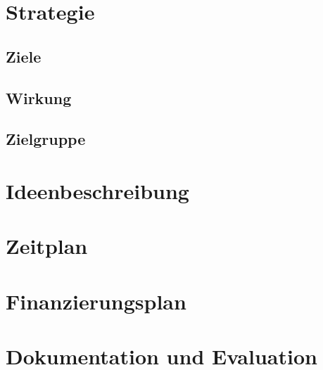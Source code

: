 \chapter{Strategie}

\section{Ziele}

\section{Wirkung}

\section{Zielgruppe}

\chapter{Ideenbeschreibung}

\chapter{Zeitplan}

\chapter{Finanzierungsplan}

\chapter{Dokumentation und Evaluation}